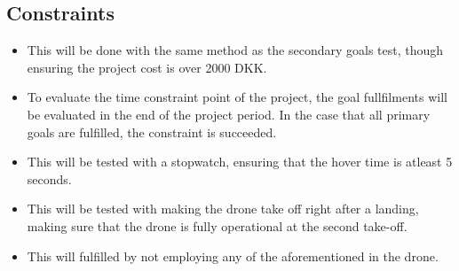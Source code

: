 \subsection{Constraints}
\begin{itemize}
    \item
          This will be done with the same method as the secondary goals test, though ensuring the project cost is over 2000 DKK.
    \item
          To evaluate the time constraint point of the project, the goal fullfilments will be evaluated in the end of the project period. In the case that all primary goals are fulfilled, the constraint is succeeded.
    \item
          This will be tested with a stopwatch, ensuring that the hover time is atleast 5 seconds.
    \item
          This will be tested with making the drone take off right after a landing, making sure that the drone is fully operational at the second take-off.
    \item
          This will fulfilled by not employing any of the aforementioned in the drone.
\end{itemize}

